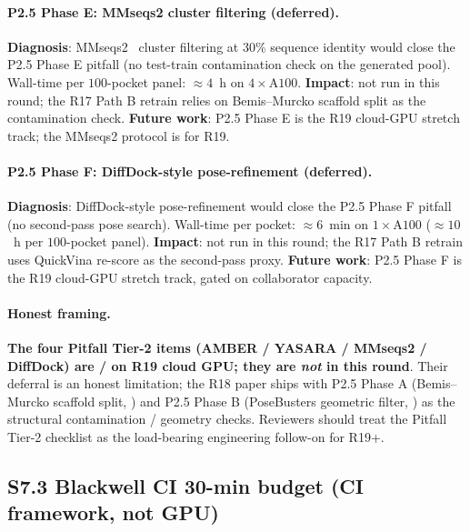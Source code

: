 \paragraph{P2.5 Phase E: MMseqs2 cluster filtering (deferred).}
\textbf{Diagnosis}: MMseqs2~\citep{steinegger2017mmseqs2}
cluster filtering at $30\%$ sequence identity would close the
P2.5 Phase E pitfall (no test-train contamination check on
the generated pool).  Wall-time per $100$-pocket panel:
$\approx 4$~h on $4 \times \mathrm{A100}$.  \textbf{Impact}:
not run in this round; the R17 Path B retrain relies on
Bemis--Murcko scaffold split as the contamination check.
\textbf{Future work}: P2.5 Phase E is the R19 cloud-GPU
stretch track; the MMseqs2 protocol is \DESIGN{} for R19.

\paragraph{P2.5 Phase F: DiffDock-style pose-refinement (deferred).}
\textbf{Diagnosis}: DiffDock-style pose-refinement would
close the P2.5 Phase F pitfall (no second-pass pose search).
Wall-time per pocket: $\approx 6$~min on $1 \times \mathrm{A100}$
($\approx 10$~h per $100$-pocket panel).  \textbf{Impact}: not
run in this round; the R17 Path B retrain uses QuickVina
re-score as the second-pass proxy.  \textbf{Future work}:
P2.5 Phase F is the R19 cloud-GPU stretch track, gated on
collaborator capacity.

\paragraph{Honest framing.}
\textbf{The four Pitfall Tier-2 items (AMBER / YASARA /
MMseqs2 / DiffDock) are \DESIGN{} / \PROJECTED{} on R19 cloud
GPU; they are \emph{not} \MEASURED{} in this round}.  Their
deferral is an honest limitation; the R18 paper ships with
P2.5 Phase A (Bemis--Murcko scaffold split, \MEASURED{}) and
P2.5 Phase B (PoseBusters geometric filter, \MEASURED{}) as
the structural contamination / geometry checks.  Reviewers
should treat the Pitfall Tier-2 checklist as the
load-bearing engineering follow-on for R19+.

\subsection*{S7.3 Blackwell CI 30-min budget (CI framework, not GPU)}
\label{supp:s7-ci-budget}

